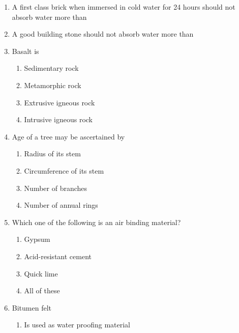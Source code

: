 \documentclass[11pt,a4paper]{article}
\begin{document}
\begin{enumerate}
\item{A first class brick when immersed in cold water for 24 hours should not absorb water more than}
\\
\item{A good building stone should not absorb water more than}
\\
\item{Basalt is}
\begin{enumerate}[label=\Alph*.]
\item{Sedimentary rock}
\item{Metamorphic rock}
\item{Extrusive igneous rock}
\item{Intrusive igneous rock}
\end{enumerate}
\item{Age of a tree may be ascertained by}
\begin{enumerate}[label=\Alph*.]
\item{Radius of its stem}
\item{Circumference of its stem}
\item{Number of branches}
\item{Number of annual rings}
\end{enumerate}
\item{Which one of the following is an air binding material?}
\begin{enumerate}[label=\Alph*.]
\item{Gypsum}
\item{Acid-resistant cement}
\item{Quick lime}
\item{All of these}
\end{enumerate}
\item{Bitumen felt}
\begin{enumerate}[label=\Alph*.]
\item{Is used as water proofing material}

\end{enumerate}
\end{enumerate}
\end{document}
